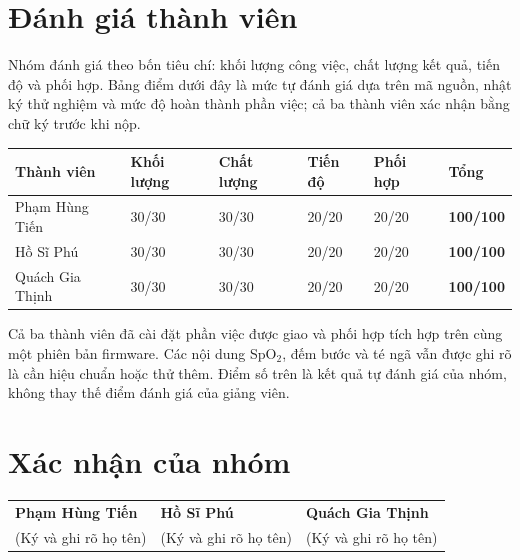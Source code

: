 \documentclass[12pt]{article}
\begin{document}
\section{Đánh giá thành viên}

Nhóm đánh giá theo bốn tiêu chí: khối lượng công việc, chất lượng kết quả, tiến độ và phối hợp. Bảng điểm dưới đây là mức tự đánh giá dựa trên mã nguồn, nhật ký thử nghiệm và mức độ hoàn thành phần việc; cả ba thành viên xác nhận bằng chữ ký trước khi nộp.

\footnotesize\noindent
\begin{tabularx}{\textwidth}{L{3.2cm} C{2.0cm} C{2.0cm} C{1.7cm} C{1.8cm} Y}
\toprule
\textbf{Thành viên} & \textbf{Khối lượng} & \textbf{Chất lượng} & \textbf{Tiến độ} & \textbf{Phối hợp} & \textbf{Tổng}\\
\midrule
Phạm Hùng Tiến & 30/30 & 30/30 & 20/20 & 20/20 & \textbf{100/100}\\
Hồ Sĩ Phú & 30/30 & 30/30 & 20/20 & 20/20 & \textbf{100/100}\\
Quách Gia Thịnh & 30/30 & 30/30 & 20/20 & 20/20 & \textbf{100/100}\\
\bottomrule
\end{tabularx}
\normalsize

Cả ba thành viên đã cài đặt phần việc được giao và phối hợp tích hợp trên cùng một phiên bản firmware. Các nội dung SpO$_2$, đếm bước và té ngã vẫn được ghi rõ là cần hiệu chuẩn hoặc thử thêm. Điểm số trên là kết quả tự đánh giá của nhóm, không thay thế điểm đánh giá của giảng viên.

\section{Xác nhận của nhóm}

\vspace{0.4cm}
\begin{tabularx}{\textwidth}{@{}>{\centering\arraybackslash}X >{\centering\arraybackslash}X >{\centering\arraybackslash}X@{}}
\textbf{Phạm Hùng Tiến} & \textbf{Hồ Sĩ Phú} & \textbf{Quách Gia Thịnh}\\[1.1cm]
(Ký và ghi rõ họ tên) & (Ký và ghi rõ họ tên) & (Ký và ghi rõ họ tên)
\end{tabularx}
\end{document}
